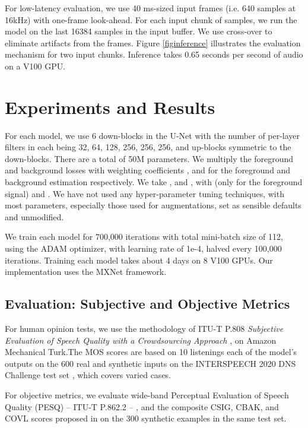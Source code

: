 \documentclass[english]{article}
\begin{document}
For low-latency evaluation, we use 40 ms-sized input frames (i.e. 640 samples at 16kHz) with one-frame look-ahead. For each input chunk of samples, we run the model on the last 16384 samples in the input buffer. We use cross-over to eliminate artifacts from the frames. Figure \ref{figinference} illustrates the evaluation mechanism for two input chunks. Inference takes 0.65 seconds per second of audio on a V100 GPU.




\section{Experiments and Results}

For each model, we use 6 down-blocks in the U-Net with the number of per-layer filters in each being 32, 64, 128, 256, 256, 256, and up-blocks symmetric to the down-blocks. There are a total of 50M parameters. We multiply the foreground and background losses with weighting coefficients , and  for the foreground and background estimation respectively. We take , and , with (only for the foreground signal)  and . We have not used any hyper-parameter tuning techniques, with most parameters, especially those used for augmentations, set as sensible defaults and unmodified. 

We train each model for 700,000 iterations with total mini-batch size of 112, using the ADAM optimizer, with learning rate of 1e-4, halved every 100,000 iterations. Training each model takes about 4 days on 8 V100 GPUs. Our implementation uses the MXNet \cite{mxnet} framework. 

\subsection{Evaluation: Subjective and Objective Metrics}

For human opinion tests, we use the methodology of ITU-T P.808 \emph{Subjective Evaluation of Speech Quality with a Crowdsourcing Approach} \cite{P.808}, on Amazon Mechanical Turk.The MOS scores are based on 10 listenings each of the model's outputs on the 600 real and synthetic inputs on the INTERSPEECH 2020 DNS Challenge test set \cite{dnschallengefinal}, which covers varied cases.  

For objective metrics, we evaluate wide-band Perceptual Evaluation of Speech Quality (PESQ) -- ITU-T P.862.2 -- \cite{P.862}, and the composite CSIG, CBAK, and COVL scores proposed in \cite{loizou2007speech} on the 300 synthetic examples in the same test set.
\end{document}
